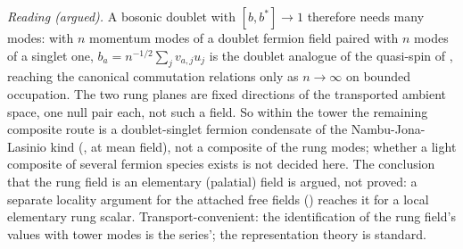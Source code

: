 \emph{Reading (argued).} A bosonic doublet with $[b, b^{*}] \to 1$ therefore needs many modes: with $n$ momentum modes of a doublet fermion field paired with $n$ modes of a singlet one, $b_{a} = n^{-1/2}\sum_{j}v_{a,j}u_{j}$ is the doublet analogue of the quasi-spin of , reaching the canonical commutation relations only as $n \to \infty$ on bounded occupation. The two rung planes are fixed directions of the transported ambient space, one null pair each, not such a field. So within the tower the remaining composite route is a doublet-singlet fermion condensate of the Nambu-Jona-Lasinio kind (, at mean field), not a composite of the rung modes; whether a light composite of several fermion species exists is not decided here. The conclusion that the rung field is an elementary (palatial) field is argued, not proved: a separate locality argument for the attached free fields () reaches it for a local elementary rung scalar. Transport-convenient: the identification of the rung field's values with tower modes is the series'; the representation theory is standard.

